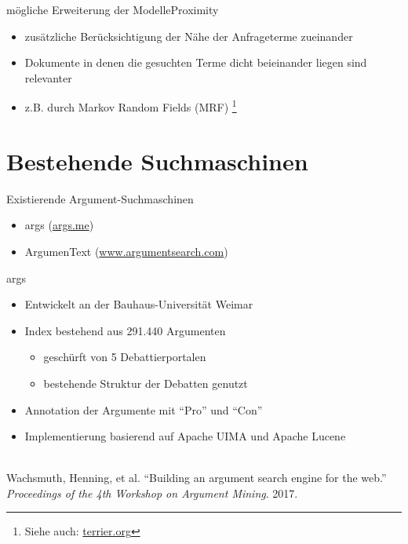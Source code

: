 \documentclass{beamer}
\newcommand\blfootnote[1]{%
	\begingroup
	\renewcommand\thefootnote{}\footnote{#1}%
	\addtocounter{footnote}{-1}%
	\endgroup
}
\begin{document}
	\begin{frame}{mögliche Erweiterung der Modelle}{Proximity}
		\begin{itemize}[<+->]
			\item zusätzliche Berücksichtigung der Nähe der Anfrageterme zueinander
			\item Dokumente in denen die gesuchten Terme dicht beieinander liegen sind relevanter
			\item z.B. durch Markov Random Fields (MRF) \blfootnote{Siehe auch: \href{http://terrier.org/docs/v3.5/javadoc/org/terrier/matching/dsms/MRFDependenceScoreModifier.html}{terrier.org}}
		\end{itemize}
	\end{frame}

	\section{Bestehende Suchmaschinen}
	\begin{frame}{Existierende Argument-Suchmaschinen}
		\begin{itemize}
			\item args (\url{args.me})
			\item ArgumenText (\url{www.argumentsearch.com})
		\end{itemize}
	\end{frame}
	\begin{frame}{args}
		\begin{itemize}
			\item Entwickelt an der Bauhaus-Universität Weimar
			\item Index bestehend aus 291.440 Argumenten
			\begin{itemize}
				\item geschürft von 5 Debattierportalen
				\item bestehende Struktur der Debatten genutzt
			\end{itemize}
			\item Annotation der Argumente mit ``Pro'' und ``Con''
			\item Implementierung basierend auf Apache UIMA und Apache Lucene
		\end{itemize}
		~\\
		\tiny Wachsmuth, Henning, et al. ``Building an argument search engine for the web.''
		\textit{Proceedings of the 4th Workshop on Argument Mining}. 2017.
	\end{frame}
\end{document}
